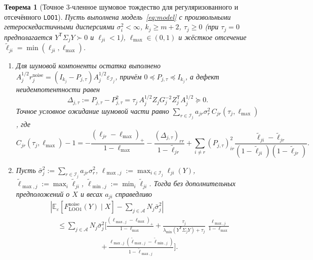 \documentclass[11pt,a4paper]{article}
\numberwithin{equation}{section}
\newtheorem{theorem}{Теорема}[section]
\theoremstyle{definition}
\theoremstyle{remark}
\newcommand{\E}{\mathbb{E}}
\newcommand{\T}{^{\mathsf T}}
\newcommand{\abs}[1]{\left\lvert #1 \right\rvert}
\begin{document}
\begin{theorem}[Точное 3-членное шумовое тождество для регуляризованного и отсечённого \texttt{LOO1}]
\label{thm:loo1-3term}
Пусть выполнена модель~\eqref{eq:model} с произвольными гетероскедастичными дисперсиями $\sigma_i^2 < \infty$,
$k_j \ge m+2$, $\tau_j \ge 0$ (при $\tau_j = 0$ предполагается $Y\T \Sigma_j Y \succ 0$ и $\ell_{ji} < 1$),
$\ell_{\max} \in (0, 1)$ и жёсткое отсечение $\tilde\ell_{ji} = \min(\ell_{ji}, \ell_{\max})$.
\begin{enumerate}[label=(\alph*)]
  \item Для шумовой компоненты остатка выполнено $A_j^{1/2} r_j^{\mathrm{noise}} = (I_{k_j} - P_{j,\tau}) A_j^{1/2} \varepsilon_{\mathcal{I}_j}$,
  причём $0 \preceq P_{j,\tau} \preceq I_{k_j}$, а дефект неидемпотентности равен
  \begin{equation}\label{eq:delta-tau}
    \Delta_{j,\tau} := P_{j,\tau} - P_{j,\tau}^2 = \tau_j\, A_j^{1/2} Z_j G_j^{-2} Z_j\T A_j^{1/2} \succeq 0.
  \end{equation}
  Точное условное ожидание шумовой части равно $\sum_{r \in \mathcal{I}_j} a_{jr} \sigma_r^2\, C_{jr}(\tau_j, \ell_{\max})$, где
  \begin{equation}\label{eq:3term}
    C_{jr}(\tau_j, \ell_{\max}) - 1
    = -\frac{(\ell_{jr} - \ell_{\max})_+}{1 - \ell_{\max}}
      -\frac{(\Delta_{j,\tau})_{rr}}{1 - \tilde\ell_{jr}}
      +\sum_{i \ne r} (P_{j,\tau})_{ir}^2 \frac{\tilde\ell_{ji} - \tilde\ell_{jr}}{(1 - \tilde\ell_{ji})(1 - \tilde\ell_{jr})}.
  \end{equation}
  \item Пусть $\bar\sigma_j^2 := \sum_{r \in \mathcal{I}_j} a_{jr} \sigma_r^2$,
  $\ell_{\max,j} := \max_{i \in \mathcal{I}_j} \ell_{ji}(Y)$,
  $\tilde\ell_{\max,j} := \max_i \tilde\ell_{ji}$, $\tilde\ell_{\min,j} := \min_i \tilde\ell_{ji}$.
  Тогда без дополнительных предположений о $X$ и весах $a_{ji}$ справедливо
  \begin{equation}\label{eq:3term-bound}
  \begin{aligned}
    &\abs{\E_\varepsilon\!\left[F_{\mathrm{LOO1}}^{\mathrm{noise}}(Y) \mid X\right] - \sum_{j \in \mathcal{A}} N_j \bar\sigma_j^2} \\
    &\quad\le \sum_{j \in \mathcal{A}} N_j \bar\sigma_j^2
      \Biggl[\frac{(\ell_{\max,j} - \ell_{\max})_+}{1 - \ell_{\max}}
      + \frac{\tau_j}{\lambda_{\min}(Y\T \Sigma_j Y) + \tau_j}\,\frac{\ell_{\max,j}}{1 - \ell_{\max}} \\
    &\qquad\qquad\qquad\quad + \frac{\ell_{\max,j}(\tilde\ell_{\max,j} - \tilde\ell_{\min,j})}{1 - \tilde\ell_{\max,j}}\Biggr].

\end{aligned}
\end{equation}
\end{enumerate}
\end{theorem}
\end{document}
